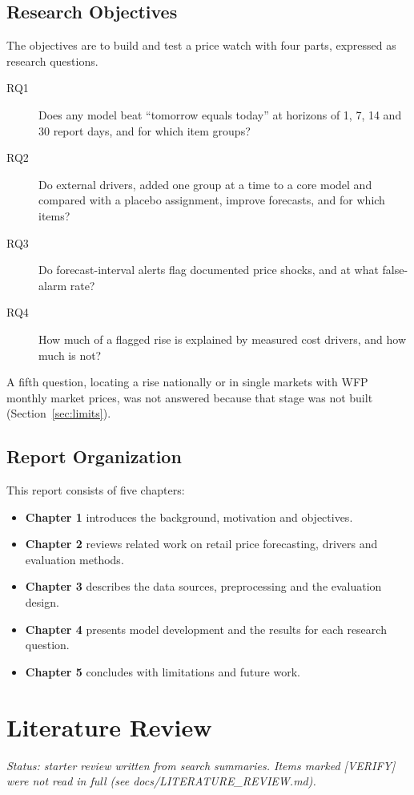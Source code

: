 \documentclass[12pt]{report}
\begin{document}
\section{Research Objectives}
The objectives are to build and test a price watch with four parts, expressed as research questions.
\begin{description}
\item[RQ1] Does any model beat ``tomorrow equals today'' at horizons of 1, 7, 14 and 30 report days, and for which item groups?
\item[RQ2] Do external drivers, added one group at a time to a core model and compared with a placebo assignment, improve forecasts, and for which items?
\item[RQ3] Do forecast-interval alerts flag documented price shocks, and at what false-alarm rate?
\item[RQ4] How much of a flagged rise is explained by measured cost drivers, and how much is not?
\end{description}
A fifth question, locating a rise nationally or in single markets with WFP monthly market prices, was not answered because that stage was not built (Section~\ref{sec:limits}).

\section{Report Organization}
This report consists of five chapters:
\begin{itemize}
    \item \textbf{Chapter 1} introduces the background, motivation and objectives.
    \item \textbf{Chapter 2} reviews related work on retail price forecasting, drivers and evaluation methods.
    \item \textbf{Chapter 3} describes the data sources, preprocessing and the evaluation design.
    \item \textbf{Chapter 4} presents model development and the results for each research question.
    \item \textbf{Chapter 5} concludes with limitations and future work.
\end{itemize}

\chapter{Literature Review}
\textit{Status: starter review written from search summaries. Items marked [VERIFY] were not read in full (see docs/LITERATURE\_REVIEW.md).}
\end{document}
